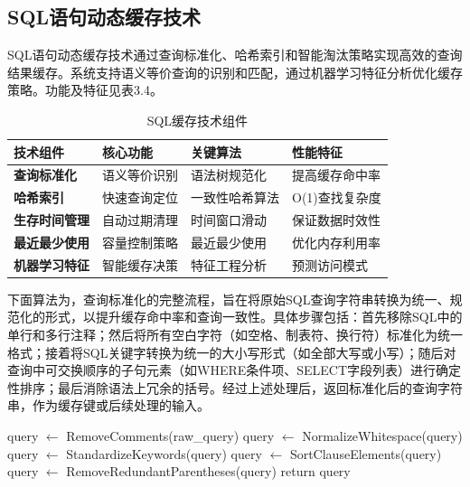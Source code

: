 \subsection{SQL语句动态缓存技术}

SQL语句动态缓存技术通过查询标准化、哈希索引和智能淘汰策略实现高效的查询结果缓存。系统支持语义等价查询的识别和匹配，通过机器学习特征分析优化缓存策略。功能及特征见表3.4。

\begin{table}[!htb]
    \caption{SQL缓存技术组件}
    \label{table3_4}
    \centering
    \begin{tabular}{p{3cm}p{3cm}p{3cm}p{3cm}}
        \hline
        技术组件 & 核心功能 & 关键算法 & 性能特征 \\
        \hline
        \textbf{查询标准化} & 语义等价识别 & 语法树规范化 & 提高缓存命中率 \\
        \textbf{哈希索引} & 快速查询定位 & 一致性哈希算法 & O(1)查找复杂度 \\
        \textbf{生存时间管理} & 自动过期清理 & 时间窗口滑动 & 保证数据时效性 \\
        \textbf{最近最少使用} & 容量控制策略 & 最近最少使用 & 优化内存利用率 \\
        \textbf{机器学习特征} & 智能缓存决策 & 特征工程分析 & 预测访问模式 \\
        \hline
    \end{tabular}
\end{table}
下面算法为，查询标准化的完整流程，旨在将原始SQL查询字符串转换为统一、规范化的形式，以提升缓存命中率和查询一致性。具体步骤包括：首先移除SQL中的单行和多行注释；然后将所有空白字符（如空格、制表符、换行符）标准化为统一格式；接着将SQL关键字转换为统一的大小写形式（如全部大写或小写）；随后对查询中可交换顺序的子句元素（如WHERE条件项、SELECT字段列表）进行确定性排序；最后消除语法上冗余的括号。经过上述处理后，返回标准化后的查询字符串，作为缓存键或后续处理的输入。
\begin{algorithm}[htbp]
\caption{查询标准化算法流程}
\label{alg3_3_6}
\begin{algorithmic}[1]
\STATE query $\leftarrow$ RemoveComments(raw\_query) 
\STATE query $\leftarrow$ NormalizeWhitespace(query) 
\STATE query $\leftarrow$ StandardizeKeywords(query) 
\STATE query $\leftarrow$ SortClauseElements(query) 
\STATE query $\leftarrow$ RemoveRedundantParentheses(query) 
\STATE return query 
\end{algorithmic}
\end{algorithm}


